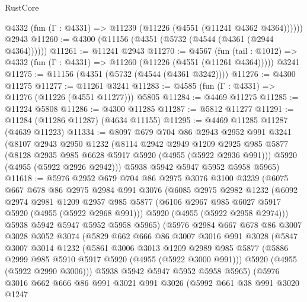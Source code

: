 \begin{lexlean}{RustCore}
\begin{coremodule}
      @4332 (fun (Γ : @4331) => @11239 (@11226 (@4551 (@11241 @4362 @4364))))))
    @2943
@11260 := @4300 (@11156 (@4351 (@5732 (@4544 (@4361 (@2944 @4364))))))
@11261 := @11241 @2943
@11270 := @4567
    (fun (tail : @1012) => @4332 (fun (Γ : @4331) => @11260 (@11226 (@4551 (@11261 @4364)))))
    @3241
@11275 := @11156 (@4351 (@5732 (@4544 (@4361 @3242))))
@11276 := @4300 @11275
@11277 := @11261 @3241
@11283 := @4585 (fun (Γ : @4331) => @11276 (@11226 (@4551 @11277))) @5805
@11284 := @4469 @11275
@11285 := @11224 @5808
@11286 := @4300 @11285
@11287 := @5812 @11277
@11291 := @11284 (@11286 @11287) (@4634 @11155)
@11295 := @4469 @11285 @11287 (@4639 @11223)
@11334 := @8097
    @679
    @704
    @86
    @2943
    @2952
    @991
    @3241
    (@8107
      @2943
      @2950
      @1232
      (@8114
        @2942
        @2949
        @1209
        @2925
        @985
        @5877
        (@8128 @2935 @985 @6628 @5917 @5920 (@4955 (@5922 @2936 @991)))
        @5920
        (@4955 (@5922 @2926 @2942)))
      @5938
      @5942
      @5947
      @5952
      @5958
      @5965)
@11618 := @5976
    @2952
    @679
    @704
    @86
    @2975
    @3076
    @3100
    @3239
    (@6075
      @667
      @678
      @86
      @2975
      @2984
      @991
      @3076
      (@6085
        @2975
        @2982
        @1232
        (@6092
          @2974
          @2981
          @1209
          @2957
          @985
          @5877
          (@6106 @2967 @985 @6027 @5917 @5920 (@4955 (@5922 @2968 @991)))
          @5920
          (@4955 (@5922 @2958 @2974)))
        @5938
        @5942
        @5947
        @5952
        @5958
        @5965)
      (@5976
        @2984
        @667
        @678
        @86
        @3007
        @3028
        @3052
        @3074
        (@5829
          @662
          @666
          @86
          @3007
          @3016
          @991
          @3028
          (@5847
            @3007
            @3014
            @1232
            (@5861
              @3006
              @3013
              @1209
              @2989
              @985
              @5877
              (@5886 @2999 @985 @5910 @5917 @5920 (@4955 (@5922 @3000 @991)))
              @5920
              (@4955 (@5922 @2990 @3006)))
            @5938
            @5942
            @5947
            @5952
            @5958
            @5965)
          (@5976
            @3016
            @662
            @666
            @86
            @991
            @3021
            @991
            @3026
            (@5992
              @661
              @38
              @991
              @3020
              @1247

\end{coremodule}
\end{lexlean}
